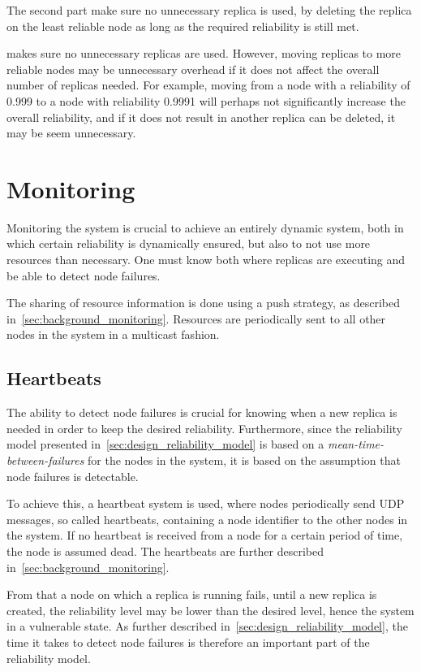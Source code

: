 \documentclass{cslthse-msc}
\begin{document}
The second part make sure no unnecessary replica is used, by deleting the replica on the least reliable node as long as the required reliability is still met.

 makes sure no unnecessary replicas are used. However, moving replicas to more reliable nodes may be unnecessary overhead if it does not affect the overall number of replicas needed. For example, moving from a node with a reliability of 0.999 to a node with reliability 0.9991 will perhaps not significantly increase the overall reliability, and if it does not result in another replica can be deleted, it may be seem unnecessary.

\section{Monitoring} \label{sec:design_monitoring}
Monitoring the system is crucial to achieve an entirely dynamic system, both in which certain reliability is dynamically ensured, but also to not use more resources than necessary. One must know both where replicas are executing and be able to detect node failures.

The sharing of resource information is done using a push strategy, as described in~\cref{sec:background_monitoring}. Resources are periodically sent to all other nodes in the system in a multicast fashion.

\subsection{Heartbeats} \label{subsec:heartbeats}
The ability to detect node failures is crucial for knowing when a new replica is needed in order to keep the desired reliability. Furthermore, since the reliability model presented in~\cref{sec:design_reliability_model} is based on a \emph{mean-time-between-failures} for the nodes in the system, it is based on the assumption that node failures is detectable. 

To achieve this, a heartbeat system is used, where nodes periodically send UDP messages, so called heartbeats, containing a node identifier to the other nodes in the system. If no heartbeat is received from a node for a certain period of time, the node is assumed dead. The heartbeats are further described in~\cref{sec:background_monitoring}.

From that a node on which a replica is running fails, until a new replica is created, the reliability level may be lower than the desired level, hence the system in a vulnerable state. As further described in~\cref{sec:design_reliability_model}, the time it takes to detect node failures is therefore an important part of the reliability model.
\end{document}
